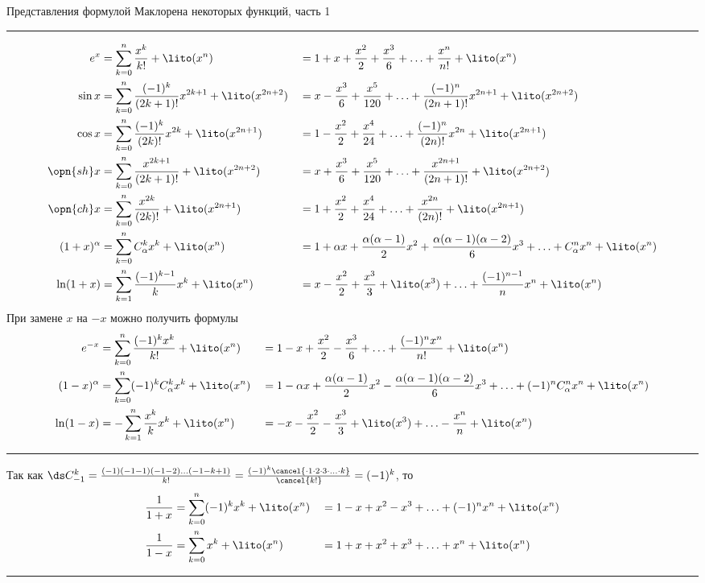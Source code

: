 Представления формулой Маклорена некоторых функций, часть 1
\hrule
\begin{align*}
e^x           & = \sum_{k=0}^{n} \frac{x^k}{k!} + \lito(x^n)                      && = 1 + x + \frac{x^2}{2} + \frac{x^3}{6} + \ldots + \frac{x^n}{n!} + \lito(x^n) \\
\sin x        & = \sum_{k=0}^{n} \frac{(-1)^k}{(2k+1)!}x^{2k+1} + \lito(x^{2n+2}) && = x - \frac{x^3}{6} + \frac{x^5}{120} + \ldots + \frac{(-1)^n}{(2n+1)!} x^{2n+1} + \lito(x^{2n+2}) \\
\cos x        & = \sum_{k=0}^{n} \frac{(-1)^k}{(2k)!}x^{2k} + \lito(x^{2n+1})     && = 1 - \frac{x^2}{2} + \frac{x^4}{24} + \ldots + \frac{(-1)^n}{(2n)!} x^{2n} + \lito(x^{2n+1}) \\
\opn{sh} x    & = \sum_{k=0}^{n} \frac{x^{2k+1}}{(2k+1)!} + \lito(x^{2n+2})       && = x + \frac{x^3}{6} + \frac{x^5}{120} + \ldots + \frac{x^{2n+1}}{(2n+1)!} + \lito(x^{2n+2}) \\
\opn{ch} x    & = \sum_{k=0}^{n} \frac{x^{2k}}{(2k)!} + \lito(x^{2n+1})           && = 1 + \frac{x^2}{2} + \frac{x^4}{24} + \ldots + \frac{x^{2n}}{(2n)!} + \lito(x^{2n+1}) \\
(1+x)^\alpha  & = \sum_{k=0}^{n} C_\alpha^k x^k + \lito(x^n)                      && = 1 + \alpha x + \frac{\alpha (\alpha-1)}{2} x^2 + \frac{\alpha (\alpha-1) (\alpha-2)}{6} x^3 + \ldots + C_\alpha^n x^n + \lito(x^n) \\
\ln(1+x)      & = \sum_{k=1}^{n} \frac{(-1)^{k-1}}{k} x^k + \lito(x^n)            && = x - \frac{x^2}{2} + \frac{x^3}{3} + \lito(x^3) + \ldots + \frac{(-1)^{n-1}}{n} x^n + \lito(x^n)
\end{align*}
При замене $x$ на $-x$ можно получить формулы
\begin{align*}
e^{-x}        & = \sum_{k=0}^{n} \frac{(-1)^k x^k}{k!} + \lito(x^n)               && = 1 - x + \frac{x^2}{2} - \frac{x^3}{6} + \ldots + \frac{(-1)^n x^n}{n!} + \lito(x^n)\\
(1-x)^\alpha  & = \sum_{k=0}^{n} (-1)^k C_\alpha^k x^k + \lito(x^n)               && = 1 - \alpha x + \frac{\alpha (\alpha-1)}{2} x^2 - \frac{\alpha (\alpha-1) (\alpha-2)}{6} x^3 + \ldots + (-1)^n C_\alpha^n x^n + \lito(x^n) \\
\ln(1-x)      & = -\sum_{k=1}^{n} \frac{x^k}{k} x^k + \lito(x^n)                  && = -x -\frac{x^2}{2} -\frac{x^3}{3} + \lito(x^3) + \ldots - \frac{x^n}{n} + \lito(x^n)
\end{align*}
\hrule
Так как $\ds C_{-1}^k = \frac{(-1)(-1-1)(-1-2) \ldots (-1-k+1)}{k!} = \frac{(-1)^k \cancel{\cdot 1 \cdot 2 \cdot 3 \cdot \ldots \cdot k}}{\cancel{k!}} = (-1)^k$, то
\begin{align*}
\frac{1}{1+x} & = \sum_{k=0}^{n} (-1)^k x^k + \lito(x^n)                          && = 1 - x + x^2 - x^3 + \ldots + (-1)^n x^n + \lito(x^n) \\
\frac{1}{1-x} & = \sum_{k=0}^{n} x^k + \lito(x^n)                                 && = 1 + x + x^2 + x^3 + \ldots + x^n + \lito(x^n)
\end{align*}
\hrule

